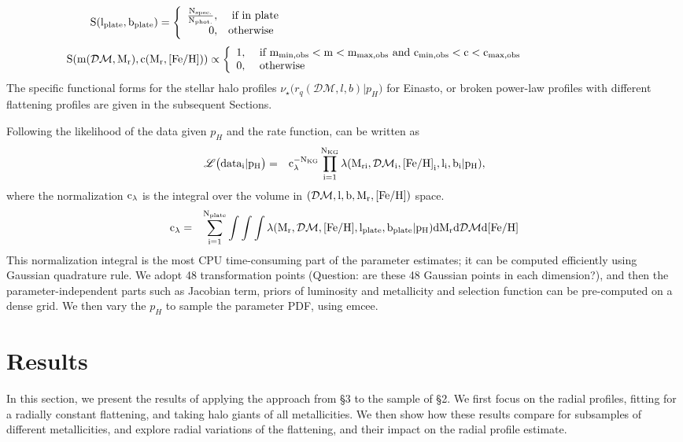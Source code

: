 \documentclass[12pt,preprint]{aastex}
\newcommand{\DM}{\mathcal{DM}}
\newcommand{\feh}{{\rm [Fe/H]}}
\newcommand{\lph}{\mathscr{L}\bigl({data_i}|p_H\bigr)}
\begin{document}
$$
\rm S(l_{plate},b_{plate})=\left\{ \begin{array}{rl}
\rm \frac{\rm N_{spec.}}{\rm N_{phot.}}, &\mbox{ \rm if in plate} ~~~~~~~~~~~~~~~~~~~~~~~~~~~~~~~~~~~~~~~~~~~~~~~~~~~~~~~~~~~~~~~~~~~~~~~~~~~~~\\
0, &\mbox{\rm otherwise}~~~~~~~~~~~~~~~~~~~~~~~~~~~~~~~~~~~~~~~~~~~~~~~~~~~~~~~~~~~~~~~~~~~~~~~~~~~~~~~~~~~~~~~
\end{array} \right.
$$
$$
\rm S(m(\DM,M_r),c(M_r,\feh))\propto \left\{ \begin{array}{rl}
1, &\mbox{ \rm if $\rm m_{min,obs}<m<m_{max,obs}$ and $\rm c_{min,obs}<c<c_{max,obs}$} ~~~~~~~~~~~~~~~~~~~~~~~~~~ \\
0, &\mbox{ otherwise}~~~~~~~~~~~~~~~~~~~~~~~~~~~~~~~~~~~~~~~~~~~~~~~~~~~~~
\end{array} \right.
$$
The specific functional forms for the stellar halo profiles $\nu_\star\bigl (r_q(\DM,l,b)|p_H\bigr )$
for Einasto, or broken power-law profiles with different flattening profiles are given in the subsequent Sections.

Following \citet{Bovy2012} the likelihood of the data given $p_H$ and the rate function, can be written as
\begin{eqnarray}
\rm \lph &=& \rm c_{\lambda}^{-N_{KG}}\prod \limits_{i=1}^{N_{KG}}\lambda(M_{ri},\DM_i,\feh_i,l_i,b_i|p_H),
\end{eqnarray}
where the normalization $\rm c_\lambda$ is the integral over the volume in $\rm (\DM,l,b,M_r,\feh)$ space.
\begin{eqnarray}
\rm c_\lambda&=&\rm \sum \limits_{i=1}^{N_{plate}} \int\int\int \lambda(M_r,\DM,\feh,l_{plate},b_{plate}|p_H)dM_rd \DM d \feh
\end{eqnarray}
This normalization integral is the most CPU time-consuming part of the parameter estimates; it can be computed efficiently using Gaussian quadrature rule. We adopt 48 transformation points (Question: are these 48 Gaussian points in each dimension?), and then the parameter-independent parts such as Jacobian term, priors of luminosity and metallicity and selection function can be pre-computed on a dense grid. We then vary the $p_H$ to sample the parameter PDF, using emcee\citep{Foreman2013}.


\section{Results}
In this section, we present the results of applying the approach from \S 3 to the sample of \S 2. 
We first focus on the radial profiles, fitting for a radially constant flattening, and taking halo giants of all metallicities. We then show how these results compare for subsamples of different metallicities, and explore radial variations of the flattening, and their impact on the radial profile estimate. 
\end{document}

